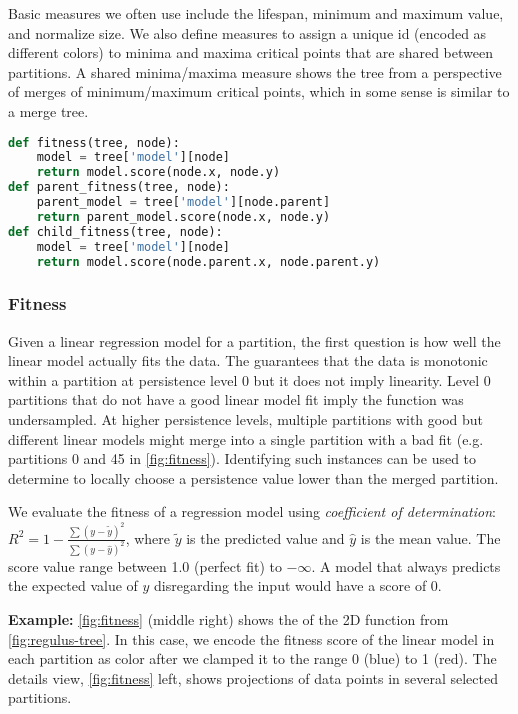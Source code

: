 Basic measures we often use include the lifespan, minimum and maximum value, and normalize size. We also define measures to assign a unique id (encoded as different colors) to minima and maxima critical points that are shared between partitions. A shared minima/maxima measure shows the tree from a perspective of merges of minimum/maximum critical points, which in some sense is similar to a merge tree.


\begin{lstlisting}[language=Python, caption=Fitness score (not suitable for derived trees), float=b, label=code:fitness]
def fitness(tree, node):
    model = tree['model'][node]
    return model.score(node.x, node.y)
def parent_fitness(tree, node):
    parent_model = tree['model'][node.parent]
    return parent_model.score(node.x, node.y)  
def child_fitness(tree, node):
    model = tree['model'][node]
    return model.score(node.parent.x, node.parent.y)
\end{lstlisting}

\subsubsection{Fitness}
\label{sec:fitness}
Given a linear regression model for a partition, the first question is how well the linear model actually fits the data. The \MSC guarantees that the data is monotonic within a partition at persistence level 0 but it does not imply linearity. Level 0 partitions that do not have a good linear model fit imply the function was undersampled. At higher persistence levels, multiple partitions with good but different linear models might merge into a single partition with a bad fit (e.g. partitions 0 and 45 in \autoref{fig:fitness}). Identifying such instances can be used to determine to locally choose a persistence value lower than the merged partition. 

We evaluate the fitness of a regression model using \textit{coefficient of determination}:
$R^2 = 1 - \frac{\sum (y - \tilde{y})^2}{\sum (y - \hat{y})^2} $,
where $\tilde{y}$ is the predicted value and $\hat{y}$ is the mean value. The score value range between 1.0 (perfect fit) to $-\infty$. A model that always predicts the expected value of $y$ disregarding the input would have a score of 0. 

\textbf{Example:}
\autoref{fig:fitness} (middle right) shows the \RT of the 2D function from \autoref{fig:regulus-tree}. In this case, we encode the fitness score of the linear model in each partition as color after we clamped it to the range 0 (blue) to 1 (red). The details view, \autoref{fig:fitness} left, shows projections of data points in several selected partitions. 

